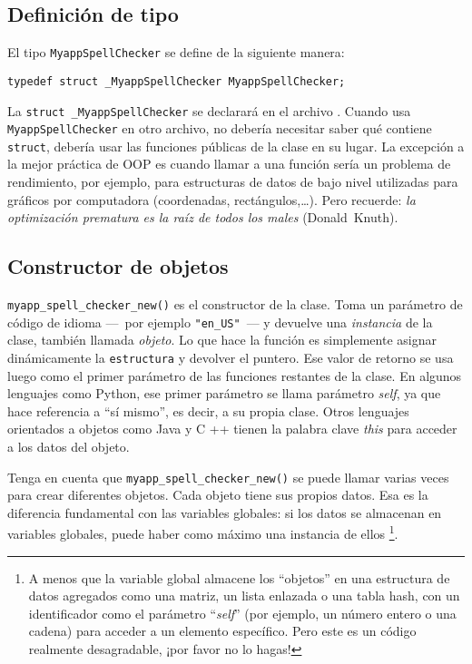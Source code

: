 \subsection{Definición de tipo}
El tipo \lstinline{MyappSpellChecker} se define de la siguiente manera:

\begin{lstlisting}[style=GLib/GTK]
typedef struct _MyappSpellChecker MyappSpellChecker;
\end{lstlisting}

La \lstinline{struct _MyappSpellChecker} se declarará en el archivo . Cuando usa \lstinline{MyappSpellChecker} en otro archivo, no debería necesitar saber qué contiene \lstinline{struct}, debería usar las funciones públicas de la clase en su lugar. La excepción a la mejor práctica de OOP es cuando llamar a una función sería un problema de rendimiento, por ejemplo, para estructuras de datos de bajo nivel utilizadas para gráficos por computadora (coordenadas, rectángulos,…). Pero recuerde: \emph{la optimización prematura es la raíz de todos los males} (Donald~Knuth).

\subsection{Constructor de objetos}
\lstinline{myapp_spell_checker_new()} es el constructor de la clase. Toma un parámetro de código de idioma ---~por ejemplo \lstinline{"en_US"}~--- y devuelve una \emph{instancia} de la clase, también llamada \emph{objeto}. Lo que hace la función es simplemente asignar dinámicamente la \lstinline{estructura} y devolver el puntero. Ese valor de retorno se usa luego como el primer parámetro de las funciones restantes de la clase. En algunos lenguajes como Python, ese primer parámetro se llama parámetro \emph{self}, ya que hace referencia a ``sí mismo'', es decir, a su propia clase. Otros lenguajes orientados a objetos como Java y C ++ tienen la palabra clave \emph{this} para acceder a los datos del objeto.

Tenga en cuenta que \lstinline{myapp_spell_checker_new()} se puede llamar varias veces para crear diferentes objetos. Cada objeto tiene sus propios datos. Esa es la diferencia fundamental con las variables globales: si los datos se almacenan en variables globales, puede haber como máximo una instancia de ellos \footnote{A menos que la variable global almacene los ``objetos'' en una estructura de datos agregados como una matriz, un lista enlazada o una tabla hash, con un identificador como el parámetro ``\emph{self}'' (por ejemplo, un número entero o una cadena) para acceder a un elemento específico. Pero este es un código realmente desagradable, ¡por favor no lo hagas!}.

